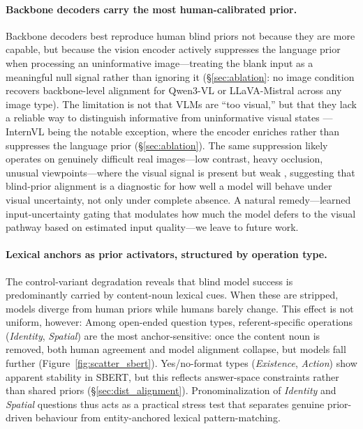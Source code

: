 \documentclass[letterpaper]{article}
\begin{document}
\paragraph{Backbone decoders carry the most human-calibrated prior.}
Backbone decoders best reproduce human blind priors not because they are more capable, but because the vision encoder actively suppresses the language prior when processing an uninformative image---treating the blank input as a meaningful null signal rather than ignoring it (\S\ref{sec:ablation}: no image condition recovers backbone-level alignment for Qwen3-VL or LLaVA-Mistral across any image type).
The limitation is not that VLMs are ``too visual,'' but that they lack a reliable way to distinguish informative from uninformative visual states \citep{lee2024vlind, han2024instinctive}---InternVL being the notable exception, where the encoder enriches rather than suppresses the language prior (\S\ref{sec:ablation}).
The same suppression likely operates on genuinely difficult real images---low contrast, heavy occlusion, unusual viewpoints---where the visual signal is present but weak \citep{ye2024mmspubench, chen2024are}, suggesting that blind-prior alignment is a diagnostic for how well a model will behave under visual uncertainty, not only under complete absence.
A natural remedy---learned input-uncertainty gating that modulates how much the model defers to the visual pathway based on estimated input quality---we leave to future work.

\paragraph{Lexical anchors as prior activators, structured by operation type.}
The control-variant degradation reveals that blind model success is
predominantly carried by content-noun lexical cues. When these are stripped,
models diverge from human priors while humans barely change. This effect
is not uniform, however: 
Among open-ended question types, referent-specific operations (\textit{Identity}, \textit{Spatial}) are the most anchor-sensitive: once the content noun is removed, both human agreement and model alignment collapse, but models fall further (Figure~\ref{fig:scatter_sbert}).
Yes/no-format types (\textit{Existence}, \textit{Action}) show apparent stability in SBERT, but this reflects answer-space constraints rather than shared priors (\S\ref{sec:dist_alignment}).
Pronominalization of \textit{Identity} and \textit{Spatial} questions thus acts as a practical stress test that separates genuine prior-driven behaviour from entity-anchored lexical pattern-matching.
\end{document}

